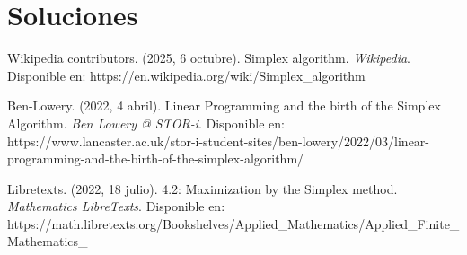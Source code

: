 \documentclass[12pt]{article}
\begin{document}
\section*{Soluciones}
\begin{thebibliography}{9}
 Wikipedia contributors. (2025, 6 octubre). Simplex algorithm. \textit{Wikipedia}. Disponible en: https://en.wikipedia.org/wiki/Simplex_algorithm

 Ben-Lowery. (2022, 4 abril). Linear Programming and the birth of the Simplex Algorithm. \textit{Ben Lowery @ STOR-i}. Disponible en: https://www.lancaster.ac.uk/stor-i-student-sites/ben-lowery/2022/03/linear-programming-and-the-birth-of-the-simplex-algorithm/

 Libretexts. (2022, 18 julio). 4.2: Maximization by the Simplex method. \textit{Mathematics LibreTexts}. Disponible en: https://math.libretexts.org/Bookshelves/Applied_Mathematics/Applied_Finite_Mathematics_%

\end{thebibliography}
\end{document}
